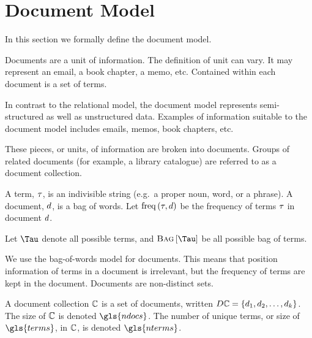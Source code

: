 \section{Document Model}
\label{sec:document-model}
	In this section we formally define the document model.
	
	Documents are a unit of information.  The definition of unit can vary.  It may represent an email, a book chapter, a memo, etc.  Contained within each document is a set of terms.
	
	In contrast to the relational model, the document model represents semi-structured as well as unstructured data.  Examples of information suitable to the document model includes emails, memos, book chapters, etc.
	
	These pieces, or units, of information are broken into documents.  Groups of related documents (for example, a library catalogue) are referred to as a document collection.

	\begin{defn}
	\label{def:document}
		A term, $\tau$, is an indivisible string (e.g.~a proper noun, word, or a phrase).  A document, $d$, is a bag of words.  Let $\operatorname{freq}\left(\tau, d\right)$ be the frequency of terms $\tau$ in document $d$.
		
		Let $\terms$ denote all possible terms, and $\bag{\terms}$ be all possible bag of terms.
	\end{defn}
	
	\begin{remark}
		We use the bag-of-words model for documents.  This means that position information of terms in a document is irrelevant, but the frequency of terms are kept in the document.  Documents are non-distinct sets.
	\end{remark}
	
	\begin{defn}
	\label{def:document-collection}
		A document collection $\mathbb{C}$ is a set of documents, written $D\mathbb{C} = \left\{d_1, d_2, \dotsc, d_k\right\}$.  The size of $\mathbb{C}$ is denoted $\gls{ndocs}$.  The number of unique terms, or size of $\gls{terms}$, in $\mathbb{C}$, is denoted $\gls{nterms}$.
	\end{defn}
	
